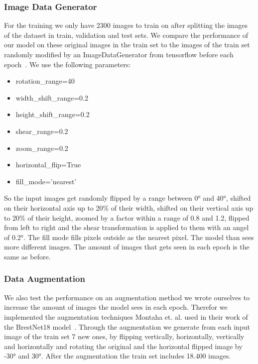 \documentclass[sn-mathphys,Numbered]{sn-jnl}%
\theoremstyle{thmstyleone}%
\theoremstyle{thmstyletwo}%
\theoremstyle{thmstylethree}%
\begin{document}
\subsubsection{Image Data Generator}\label{ImageDataGenerator}
For the training we only have 2300 images to train on after splitting the images of the dataset in train, validation and test sets. We compare the performance of our model on these original images in the train set to the images of the train set randomly modified by an ImageDataGenerator from tensorflow before each epoch~\cite{IDG}. We use the following parameters:\\
\begin{itemize}
\item rotation\_range=40
\item width\_shift\_range=0.2
\item height\_shift\_range=0.2
\item shear\_range=0.2
\item zoom\_range=0.2
\item horizontal\_flip=True
\item fill\_mode='nearest'
\end{itemize}
So the input images get randomly flipped by a range between 0° and 40°, shifted on their horizontal axis up to 20\% of their width, shifted on their vertical axis up to 20\% of their height, zoomed by a factor within a range of 0.8 and 1.2, flipped from left to right and the shear transformation is applied to them with an angel of 0.2°. The fill mode fills pixels outside as the nearest pixel. The model than sees more different images. The amount of images that gets seen in each epoch is the same as before.\\
\subsubsection{Data Augmentation}\label{DataAugmentation}
We also test the performance on an augmentation method we wrote ourselves to increase the amount of images the model sees in each epoch. Therefor we implemented the augmentation techniques Montaha et. al. used in their work of the BrestNet18 model~\cite{Montaha2021}. Through the augmentation we generate from each input image of the train set 7 new ones, by flipping vertically, horizontally, vertically and horizontally and rotating the original and the horizontal flipped image by -30° and 30°. After the augmentation the train set includes 18.400 images.\\
\end{document}
